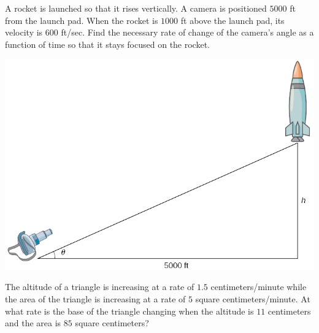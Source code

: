 \begin{example}

A rocket is launched so that it rises vertically. A camera is positioned
\(5000\) ft from the launch pad. When the rocket is \(1000\) ft above the launch pad, 
its velocity is \(600\) ft/sec. Find the necessary rate of change of the camera's angle 
as a function of time so that it stays focused on the rocket.

\includegraphics[scale=0.6]{img/4.1.3.png}

\end{example}
\vspace*{6\baselineskip}

\begin{example}

The altitude of a triangle is increasing at a rate of \(1.5\)
centimeters/minute while the area of the triangle is increasing at a
rate of \(5\) square centimeters/minute. At what rate is the base of the
triangle changing when the altitude is \(11\) centimeters and the area
is \(85\) square centimeters?

\end{example}
\vspace*{6\baselineskip}

